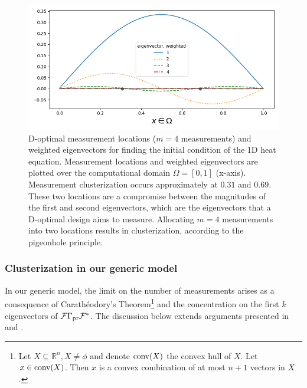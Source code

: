\begin{figure}\label{fig:eigenvectors}
    \centering
    \includegraphics[width=\textwidth]{figs/eigenvectors_dst_scaled.png}
    \caption{D-optimal measurement locations ($m=4$ measurements) and
      weighted eigenvectors for finding the initial condition of the
      1D heat equation. Measurement locations and weighted
      eigenvectors are plotted over the computational domain $\Omega =
      [0, 1]$ (x-axis). Measurement clusterization occurs
      approximately at $0.31$ and $0.69$. These two locations are a
      compromise between the magnitudes of the first and second
      eigenvectors, which are the eigenvectors that a D-optimal design
      aims to measure. Allocating $m=4$ measurements into two
      locations results in clusterization, according to the pigeonhole
      principle.}
  \label{fig:why}
\end{figure}



\subsubsection{Clusterization in our generic model}
In our generic model, the limit on the number of measurements arises
as a consequence of Carath\'eodory's Theorem\footnote{Let $X \subseteq
\mathbb{R}^n, X \neq \phi$ and denote $\operatorname*{conv} (X)$ the convex hull of
$X$. Let $x \in \operatorname*{conv} (X)$. Then $x$ is a convex combination of at
most $n+1$ vectors in $X$.} and the concentration on the first $k$
eigenvectors of $\mathcal{F} \Gamma_{\textup{pr}} \mathcal{F}^*$. The discussion below extends
arguments presented in \cite[Chapter 3]{silvey} and \cite[Section
  5.2.3]{pronzatoPazman2013}.

